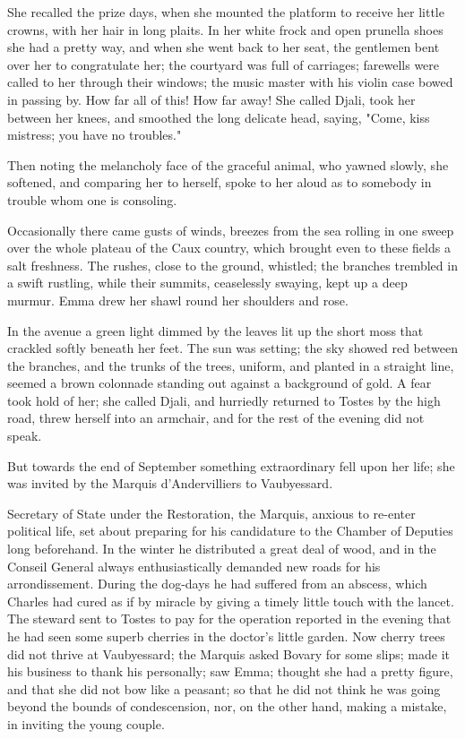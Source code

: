\documentclass{tufte-book}
\begin{document}
She recalled the prize days, when she mounted the platform to receive
her little crowns, with her hair in long plaits. In her white frock and
open prunella shoes she had a pretty way, and when she went back to her
seat, the gentlemen bent over her to congratulate her; the courtyard was
full of carriages; farewells were called to her through their windows;
the music master with his violin case bowed in passing by. How far all
of this! How far away! She called Djali, took her between her knees, and
smoothed the long delicate head, saying, "Come, kiss mistress; you have
no troubles."

Then noting the melancholy face of the graceful animal, who yawned
slowly, she softened, and comparing her to herself, spoke to her aloud
as to somebody in trouble whom one is consoling.

Occasionally there came gusts of winds, breezes from the sea rolling in
one sweep over the whole plateau of the Caux country, which brought
even to these fields a salt freshness. The rushes, close to the ground,
whistled; the branches trembled in a swift rustling, while their
summits, ceaselessly swaying, kept up a deep murmur. Emma drew her shawl
round her shoulders and rose.

In the avenue a green light dimmed by the leaves lit up the short moss
that crackled softly beneath her feet. The sun was setting; the sky
showed red between the branches, and the trunks of the trees, uniform,
and planted in a straight line, seemed a brown colonnade standing out
against a background of gold. A fear took hold of her; she called Djali,
and hurriedly returned to Tostes by the high road, threw herself into an
armchair, and for the rest of the evening did not speak.

But towards the end of September something extraordinary fell upon her
life; she was invited by the Marquis d'Andervilliers to Vaubyessard.

Secretary of State under the Restoration, the Marquis, anxious to
re-enter political life, set about preparing for his candidature to
the Chamber of Deputies long beforehand. In the winter he distributed a
great deal of wood, and in the Conseil General always enthusiastically
demanded new roads for his arrondissement. During the dog-days he had
suffered from an abscess, which Charles had cured as if by miracle by
giving a timely little touch with the lancet. The steward sent to Tostes
to pay for the operation reported in the evening that he had seen some
superb cherries in the doctor's little garden. Now cherry trees did not
thrive at Vaubyessard; the Marquis asked Bovary for some slips; made it
his business to thank his personally; saw Emma; thought she had a pretty
figure, and that she did not bow like a peasant; so that he did not
think he was going beyond the bounds of condescension, nor, on the other
hand, making a mistake, in inviting the young couple.
\end{document}
